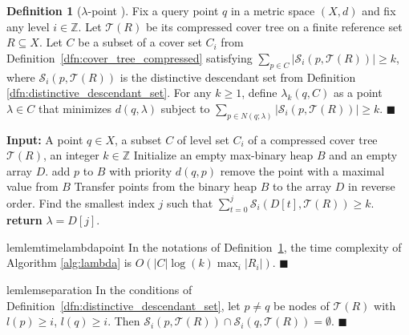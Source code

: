 \documentclass[a4paper,UKenglish,cleveref, autoref]{lipics-v2019}
\numberwithin{algocf}{section}
\theoremstyle{definition}
\newtheorem{dfn}[algocf]{Definition}
\theoremstyle{definition}
\theoremstyle{definition}
\theoremstyle{plain}
\newcommand{\Z}{\mathbb{Z}}
\newcommand{\T}{\mathcal{T}}
\newcommand{\Sd}{\mathcal{S}}
\newcommand{\la}{\lambda}
\newcommand{\bs}{\hfill $\blacksquare$}
\begin{document}
\begin{dfn}[$\la$-point {\cite[Definition~5.6]{elkin2021new}}]
\label{dfn:lambda-point}
Fix a query point $q$ in a metric space $(X,d)$ and fix any level $i \in \Z$. 
Let $\T(R)$ be its compressed cover tree on a finite reference set $R \subseteq X$. 
Let $C$ be a subset of a cover set $C_i$ from Definition~\ref{dfn:cover_tree_compressed} satisfying $\sum_{p \in C}|\Sd_i(p, \T(R))| \geq k$, where $\Sd_i(p, \T(R))$ is the distinctive descendant set from Definition \ref{dfn:distinctive_descendant_set}.
For any $k\geq 1$, define $\la_k(q,C)$ as a point $\la\in C$ that minimizes $d(q,\la)$ subject to $\sum\limits_{p \in N(q;\la)}|\Sd_i(p, \T(R)) |\geq k$. 
\bs
\end{dfn}

\begin{algorithm}
\caption{Computing a $\lambda$-point of Definition \ref{dfn:lambda-point} in line 3 of Algorithm \ref{alg:UpdateCandidatesKNN},
 {\cite[Lemma~5.6]{elkin2021new}}}
\label{alg:lambda}
\begin{algorithmic}[1]
\STATE \textbf{Input:} A point $q \in X$, a subset $C$ of level set $C_i$ of a compressed cover tree $\T(R)$, an integer $k \in \Z$
\STATE Initialize an empty max-binary heap $B$ and an empty array $D$.
\STATE add $p$ to $B$ with priority $d(q,p)$
\STATE remove the point with a maximal value from $B$
\ENDIF
\ENDFOR
\STATE Transfer points from the binary heap $B$ to the array $D$ in reverse order. 
\STATE Find the smallest index $j$ such that $\sum^{j}_{t = 0}\Sd_i(D[t] , \T(R)) \geq k$.
\STATE \textbf{return} $\lambda = D[j]$. 
\end{algorithmic}
\end{algorithm}

\begin{restatable}{lem}{lemtimelambdapoint}
\label{lem:time_lambdapoint}
In the notations of Definition~\ref{dfn:lambda-point}, the time complexity of Algorithm \ref{alg:lambda} is $O(|C|\log(k)\max_i |R_i|)$.  \bs
\end{restatable}

\begin{restatable} {lem}{lemseparation}
\label{lem:separation}
In the conditions of Definition~\ref{dfn:distinctive_descendant_set}, let $p\neq q$ be nodes of $\T(R)$ with $l(p) \geq i$, $l(q) \geq i$. Then $\Sd_i(p , \T(R)) \cap \Sd_{i}(q, \T(R)) = \emptyset$.  \bs
\end{restatable}
\end{document}
